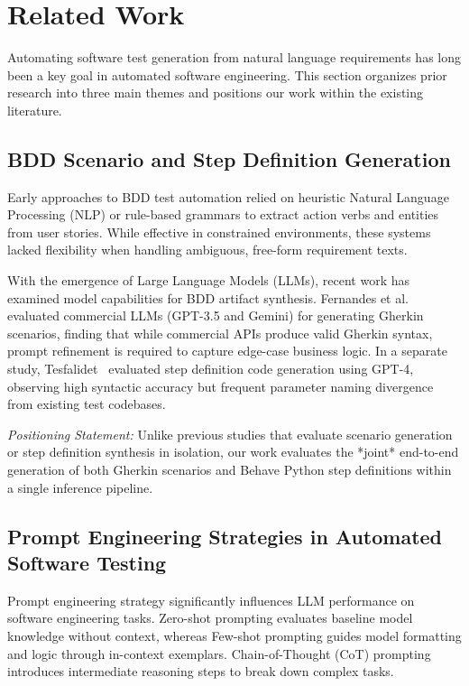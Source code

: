 \section{Related Work}
\label{sec:related}

Automating software test generation from natural language requirements has long been a key goal in automated software engineering. This section organizes prior research into three main themes and positions our work within the existing literature.

\subsection{BDD Scenario and Step Definition Generation}
Early approaches to BDD test automation relied on heuristic Natural Language Processing (NLP) or rule-based grammars to extract action verbs and entities from user stories. While effective in constrained environments, these systems lacked flexibility when handling ambiguous, free-form requirement texts.

With the emergence of Large Language Models (LLMs), recent work has examined model capabilities for BDD artifact synthesis. Fernandes et al.~\cite{fernandes2024} evaluated commercial LLMs (GPT-3.5 and Gemini) for generating Gherkin scenarios, finding that while commercial APIs produce valid Gherkin syntax, prompt refinement is required to capture edge-case business logic. In a separate study, Tesfalidet~\cite{tesfalidet2025} evaluated step definition code generation using GPT-4, observing high syntactic accuracy but frequent parameter naming divergence from existing test codebases.

\textit{Positioning Statement:} Unlike previous studies that evaluate scenario generation or step definition synthesis in isolation, our work evaluates the *joint* end-to-end generation of both Gherkin scenarios and Behave Python step definitions within a single inference pipeline.

\subsection{Prompt Engineering Strategies in Automated Software Testing}
Prompt engineering strategy significantly influences LLM performance on software engineering tasks. Zero-shot prompting evaluates baseline model knowledge without context, whereas Few-shot prompting guides model formatting and logic through in-context exemplars. Chain-of-Thought (CoT) prompting introduces intermediate reasoning steps to break down complex tasks.

